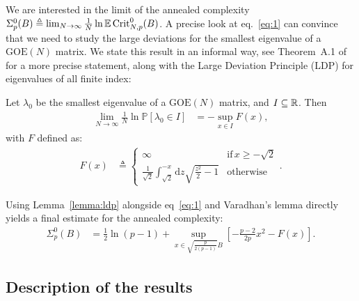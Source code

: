 \documentclass[amsmath,amssymb,nofootinbib,prd]{article}
\begin{document}
	We are interested in the limit of the annealed complexity $\Sigma^0_p(B) \triangleq \lim_{N \to \infty} \frac{1}{N} \ln \mathbb{E} \, \mathrm{Crit}_{N,p}^0(B)$. 
	A precise look at eq.~\eqref{eq:1} can convince that we need to study the large deviations for the smallest eigenvalue of a $\mathrm{GOE}(N)$ matrix. We state this result in an informal way, see Theorem~A.1 of \cite{auffinger2013random} for a more precise statement, along with the Large Deviation Principle (LDP) for eigenvalues of all finite index:
\begin{lemma}\label{lemma:ldp}
Let $\lambda_0$ be the smallest eigenvalue of a $\mathrm{GOE}(N)$ matrix, and $I \subseteq \mathbb{R}$. Then
\begin{align}
\lim_{N \to \infty} \frac{1}{N} \ln \mathbb{P}\left[\lambda_0 \in I\right] &= - \sup_{x \in I} F(x),
\end{align}
with $F$ defined as:
\begin{align}
F(x) &\triangleq \begin{cases} \infty &\mathrm{if}\,x \geq -\sqrt{2}  \\
 \frac{1}{\sqrt{2}} \int_{\sqrt{2}}^{-x} \mathrm{d}z\sqrt{\frac{z^2}{2} -1} & \mathrm{otherwise}
\end{cases}.
\end{align}
\end{lemma}
Using Lemma~\ref{lemma:ldp} alongside eq~\eqref{eq:1} and Varadhan's lemma directly yields a final estimate for the annealed complexity:
\begin{align}\label{eq:2}
\Sigma_p^0(B) &= \frac{1}{2} \ln (p-1) + \sup_{x \in \sqrt{\frac{p}{2(p-1)}} B} \left[-\frac{p-2}{2p}x^2 - F(x)\right].
\end{align}
	
\subsection{Description of the results}\label{subsec:summary}
\end{document}
